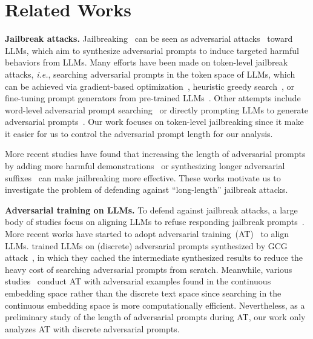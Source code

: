 \section{Related Works}
\label{sec:related-works}



\textbf{Jailbreak attacks.}
Jailbreaking~\citep{wei2023jailbroken} can be seen as adversarial attacks~\citep{szegedy2014intriguing,goodfellow2015explaining} toward LLMs, which aim to synthesize adversarial prompts to induce targeted harmful behaviors from LLMs.
Many efforts have been made on token-level jailbreak attacks, {\it i.e.}, searching adversarial prompts in the token space of LLMs, which can be achieved via gradient-based optimization~\citep{shin2020autoprompt,guo2021gradientbased,zou2023universal,liao2024amplegcg,schwinn2024soft}, heuristic greedy search~\citep{sadasivan2024fast,hayase2024querybased,jin2024jailbreaking}, or fine-tuning prompt generators from pre-trained LLMs~\citep{paulus2024advprompter}.
Other attempts include word-level adversarial prompt searching~\citep{liu2024autodan} or directly prompting LLMs to generate adversarial prompts~\citep{chao2023jailbreaking,liu2024turbo}.
Our work focuses on token-level jailbreaking since it make it easier for us to control the adversarial prompt length for our analysis.



More recent studies have found that increasing the length of adversarial prompts by adding more harmful demonstrations~\citep{anil2024many} or synthesizing longer adversarial suffixes~\citep{xu2024bag} can make jailbreaking more effective.
These works motivate us to investigate the problem of defending against ``long-length'' jailbreak attacks.






\textbf{Adversarial training on LLMs.}
To defend against jailbreak attacks, a large body of studies focus on aligning LLMs to refuse responding jailbreak prompts~\citep{ouyang2022training,rafailov2023direct,qi2024safety,qi2024finetuning,chen2024aligning}.
More recent works have started to adopt adversarial training~(AT)~\citep{madry2018towards} to align LLMs.
\citet{mazeika2024harmbench} trained LLMs on (discrete) adversarial prompts synthesized by GCG attack~\citep{zou2023universal}, in which they cached the intermediate synthesized results to reduce the heavy cost of searching adversarial prompts from scratch.
Meanwhile, various studies~\citep{xhonneux2024efficient,casper2024defending,sheshadri2024latent,yu2024robust} conduct AT with adversarial examples found in the continuous embedding space rather than the discrete text space since searching in the continuous embedding space is more computationally efficient.
Nevertheless, as a preliminary study of the length of adversarial prompts during AT, our work only analyzes AT with discrete adversarial prompts.



